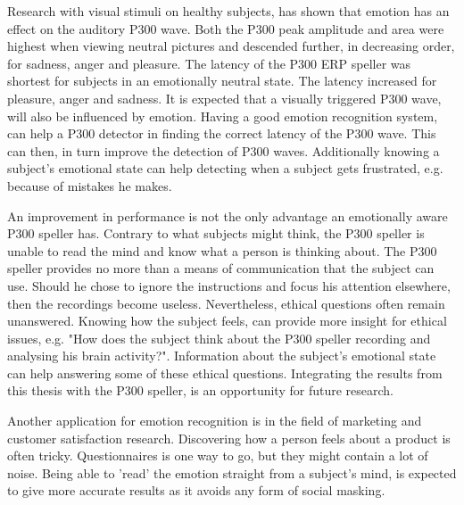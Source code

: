 
Research with visual stimuli on healthy subjects, has shown that emotion has an effect on the auditory P300 wave\cite{AuditoryP300Effect}. Both the P300 peak amplitude and area were highest when viewing neutral pictures and descended further, in decreasing order, for sadness, anger and pleasure. The latency of the P300 ERP speller was shortest for subjects in an emotionally neutral state. The latency increased for pleasure, anger and sadness. It is expected that a visually triggered P300 wave, will also be influenced by emotion. Having a good emotion recognition system, can help a P300 detector in finding the correct latency of the P300 wave. This can then, in turn improve the detection of P300 waves. Additionally knowing a subject's emotional state can help detecting when a subject gets frustrated, e.g. because of mistakes he makes.

\npar

An improvement in performance is not the only advantage an emotionally aware P300 speller has. Contrary to what subjects might think, the P300 speller is unable to read the mind and know what a person is thinking about\cite{P300Origin}. The P300 speller provides no more than a means of communication that the subject can use. Should he chose to ignore the instructions and focus his attention elsewhere, then the recordings become useless. Nevertheless, ethical questions often remain unanswered. Knowing how the subject feels, can provide more insight for ethical issues, e.g. "How does the subject think about the P300 speller recording and analysing his brain activity?". Information about the subject's emotional state can help answering some of these ethical questions. Integrating the results from this thesis with the P300 speller, is an opportunity for future research.

\clearpage

Another application for emotion recognition is in the field of marketing and customer satisfaction research. Discovering how a person feels about a product is often tricky. Questionnaires is one way to go, but they might contain a lot of noise. Being able to 'read' the emotion straight from a subject's mind, is expected to give more accurate results as it avoids any form of social masking.
